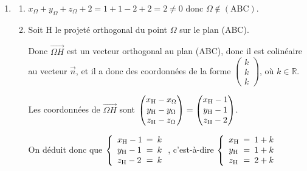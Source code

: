 \documentclass[10pt]{article}
\providecommand{\R}{\mathbb{R}}
\providecommand{\vect}[1]{\overrightarrow{#1}}
\begin{document}
\begin{enumerate}
\begin{enumerate}
Le vecteur $\vect{n}$ est donc orthogonal à deux vecteurs directeurs du plan (ABC), donc c'est un vecteur normal au plan (ABC).
		
		\item 
Le plan (ABC) a donc une équation cartésienne de la forme $x+y+z+d=0$. On détermine $d$ en utilisant le fait que le point A appartient au plan (ABC).

$\text{A}\in (\text{ABC})
\iff
x_{\text A} + y_{\text A} + z_{\text A} +d=0
\iff
1+1-4+d=0
\iff d=2$

Le plan (ABC) a donc pour équation cartésienne $x+y+z+2=0$.
	
	\end{enumerate}
	
\item 
	\begin{enumerate}
		\item 
$x_{\Omega}	 + y_{\Omega} + z_{\Omega} +2 = 1+1-2+2=2\neq 0$ donc $\Omega \notin (\text{ABC})$.
		
		\item Soit H le projeté orthogonal du point $\Omega$ sur le plan (ABC).
		
Donc $\vect{\Omega H}$ est un vecteur orthogonal au plan (ABC), donc il est colinéaire au vecteur $\vect n$, et il a donc des coordonnées de la forme
$\begin{pmatrix}
k \\k \\k
\end{pmatrix}$, où $k\in\R$.

Les coordonnées de $\vect{\Omega H}$ sont
$\begin{pmatrix}
x_{\text H} - x_{\Omega} \\ y_{\text H} - y_{\Omega} \\ z_{\text H} - z_{\Omega}
\end{pmatrix}
=
\begin{pmatrix}
x_{\text H} - 1 \\ y_{\text H} -1 \\ z_{\text H} -2
\end{pmatrix}$.

On déduit donc que
$\left \{
\begin{array}{l !{=} l}
x_{\text H} -1& k\\
y_{\text H} -1& k\\
z_{\text H} -2& k 
\end{array}
\right .$, c'est-à-dire
$\left \{
\begin{array}{l !{=} r}
x_{\text H} & 1+k\\
y_{\text H} & 1+k\\
z_{\text H} & 2+k 
\end{array}
\right .$


\end{enumerate}
\end{enumerate}
\end{document}
